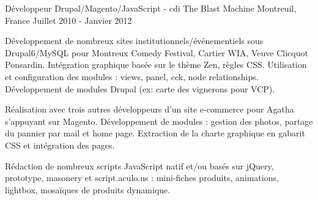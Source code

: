 \cventry
{Développeur Drupal/Magento/JavaScript - cdi} %
{The Blast Machine} %
{Montreuil, France} %
{Juillet 2010 - Janvier 2012} %
{
\begin{cvitems} %
    \item
    {
    Développement de nombreux sites institutionnels/événementiels sous Drupal6/MySQL pour
    Montreux Comedy Festival, Cartier WIA, Veuve Clicquot Ponsardin.
    Intégration graphique basée sur le thème Zen, règles CSS.
    Utilisation et configuration des modules : views, panel, cck, node relationships.
    Développement de modules Drupal (ex: carte des vignerons pour VCP).
    }
    \item
    {
    Réalisation avec trois autres développeurs d'un site e-commerce
    pour Agatha s'appuyant sur Magento.
    Développement de modules : gestion des photos, partage du pannier par mail et home page.
    Extraction de la charte graphique en gabarit CSS et intégration des pages.
    }
    \item
    {
    Rédaction de nombreux scripts JavaScript natif et/ou basés sur jQuery, prototype,
    masonery et script.aculo.us : mini-fiches produits, animations, lightbox, mosaïques
    de produits dynamique.
    }
\end{cvitems}
}